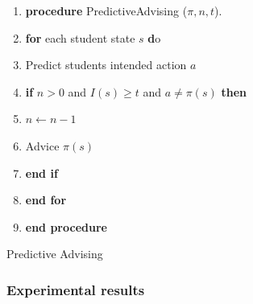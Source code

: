 \documentclass[12pt,twoside]{article}
\theoremstyle{plain}
\theoremstyle{definition}
\theoremstyle{remark}
\begin{document}
\begin{algorithm}[H]
  \scriptsize
 \begin{enumerate}
	\item \textbf{procedure} PredictiveAdvising ($\pi, n, t$). 
	\item \qquad \textbf{for} each student state $s$ \textbf do
	\item \qquad \qquad Predict students intended action $a$
	\item \qquad \qquad \textbf{if} $n > 0$ and $I(s) \geq t $  and $a \neq \pi(s)$ \textbf{then}
	\item \qquad \qquad \qquad $n \leftarrow n - 1$
	\item \qquad \qquad \qquad Advice $\pi(s)$
	\item \qquad \qquad \textbf{end if}
	\item \qquad \textbf{end for}
	\item \textbf{end procedure}
\end{enumerate}
  	\caption{Predictive Advising}
\end{algorithm}

\subsubsection{Experimental results}
\end{document}
